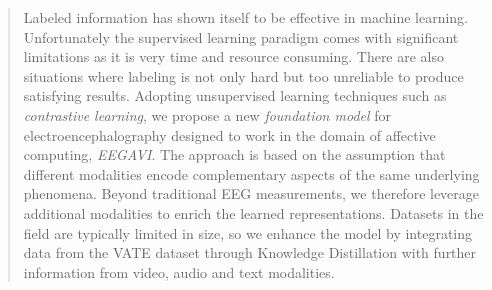 

\begin{abstract}
    Labeled information has shown itself to be effective in machine learning.
    Unfortunately the supervised learning paradigm comes with significant limitations as it is very time and resource consuming.
    There are also situations where labeling is not only hard but too unreliable to produce satisfying results.
    Adopting unsupervised learning techniques such as \textit{contrastive learning}, we propose a new \textit{foundation model}
    for electroencephalography designed to work in the domain of affective computing, \textit{EEGAVI}.
    The approach is based on the assumption that different modalities encode complementary aspects of the same underlying phenomena.
    Beyond traditional EEG measurements, we therefore leverage additional modalities to enrich the learned representations.
    Datasets in the field are typically limited in size, so we enhance the model by integrating data from the VATE dataset
    through Knowledge Distillation with further information from video, audio and text modalities.
\end{abstract}